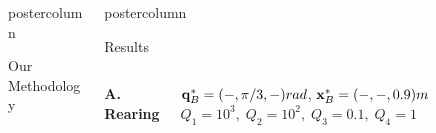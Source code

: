 \documentclass{beamer}
\newlength{\columnheight}
\begin{document}
\begin{frame}
\begin{columns}
\begin{column}{.3\textwidth}
\begin{beamercolorbox}[center]{postercolumn}
\begin{minipage}{.98\textwidth}
{\begin{myblock}{Our Methodology}
% 
% 


\end{myblock}\vfill
}\end{minipage}\end{beamercolorbox}
\end{column}

\begin{column}{.4\textwidth}
	\begin{beamercolorbox}[center]{postercolumn}
	\begin{minipage}{.98\textwidth} %
	\parbox[t][\columnheight]{\textwidth}{ %
	\begin{myblock}{Results}
	
	\begin{columns}
	
	\begin{center}
	\textbf{A. Rearing}\\
	\vspace*{5mm}
	\end{center}
	$\mathbf{q}^{*}_{B}= (-, \pi/3 , -)rad$, $\mathbf{x}^{*}_{B}= (-,-, 0.9)m$ 
	$Q_{1} = 10^3, \; Q_{2} = 10^2, \; Q_{3} = 0.1, \; Q_{4} = 1$
	

\end{columns}
\end{myblock}}
\end{minipage}
\end{beamercolorbox}
\end{column}
\end{columns}
\end{frame}
\end{document}
